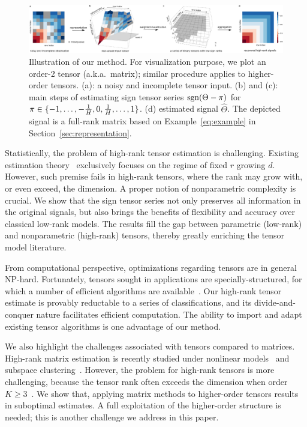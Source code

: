 \documentclass[useAMS,usenatbib,usegraphicx,referee]{biom}
\theoremstyle{plain}
\theoremstyle{definition}
\def\sign{\textup{sgn}}
\begin{document}
\begin{figure}[h!]
\centerline{\includegraphics[width=1\textwidth]{figure/demo.pdf}}
 \captionsetup{justification=raggedright,font=small}
\caption{Illustration of our method. For visualization purpose, we plot an order-2 tensor (a.k.a.\ matrix); similar procedure applies to higher-order tensors. (a): a noisy and incomplete tensor input. (b) and (c): main steps of estimating sign tensor series $\sign(\Theta-\pi)$ for $\pi\in  \{-1,\ldots,-{1\over H},0,{1\over H},\ldots,1\}$. (d) estimated signal $\hat \Theta$. The depicted signal is a full-rank matrix based on Example~\ref{eq:example} in Section~\ref{sec:representation}.}\label{fig:demo}
\end{figure}
\vspace{-.3cm}

Statistically, the problem of high-rank tensor estimation is challenging. Existing estimation theory~\citep{anandkumar2014tensor,montanari2018spectral,cai2019nonconvex} exclusively focuses on the regime of fixed $r$ growing $d$. However, such premise fails in high-rank tensors, where the rank may grow with, or even exceed, the dimension. A proper notion of nonparametric complexity is crucial. We show that the sign tensor series not only preserves all information in the original signals, but also brings the benefits of flexibility and accuracy over classical low-rank models. The results fill the gap between parametric (low-rank) and nonparametric (high-rank) tensors, thereby greatly enriching the tensor model literature. 

From computational perspective, optimizations regarding tensors are in general NP-hard. Fortunately, tensors sought in applications are specially-structured, for which a number of efficient algorithms are available~\citep{ghadermarzy2018learning,wang2018learning, han2020optimal}. Our high-rank tensor estimate is provably reductable to a series of classifications, and its divide-and-conquer nature facilitates efficient computation. The ability to import and adapt existing tensor algorithms is one advantage of our method. 

We also highlight the challenges associated with tensors compared to matrices. High-rank matrix estimation is recently studied under nonlinear models~\citep{ganti2015matrix} and subspace clustering~\citep{pmlr-v70-ongie17a,fan2019online}. However, the problem for high-rank tensors is more challenging, because the tensor rank often exceeds the dimension when order $K\geq 3$~\citep{anandkumar2017analyzing}.  We show that, applying matrix methods to higher-order tensors results in suboptimal estimates. A full exploitation of the higher-order structure is needed; this is another challenge we address in this paper.
\end{document}
